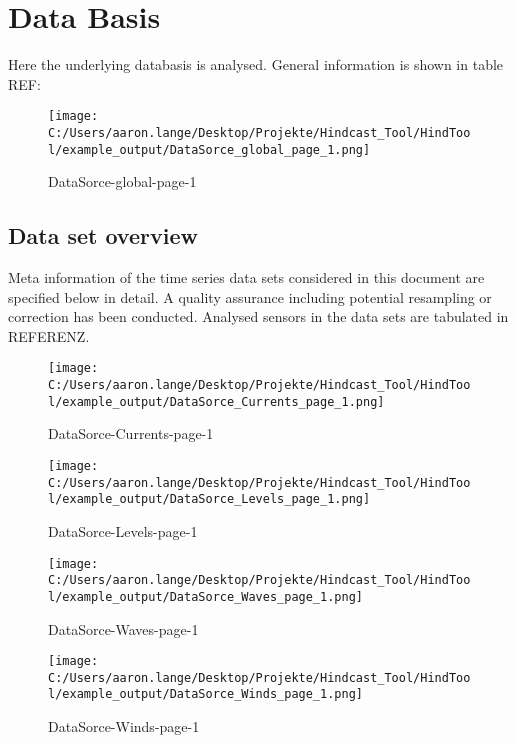 \section{Data Basis}
Here the underlying databasis is analysed. General information is shown in table REF:

\begin{figure}[H] 
 \centering 
 \texttt{[image: C:/Users/aaron.lange/Desktop/Projekte/Hindcast\_Tool/HindTool/example\_output/DataSorce\_global\_page\_1.png]} 
 \captionsetup{type=table} 
\caption{ DataSorce-global-page-1 } 
 \label{tab: DataSorce_global_page_1 } 
\end{figure}

\subsection{Data set overview}

Meta information of the time series data sets considered in this document are specified below in detail. A quality assurance including potential resampling or correction has been conducted. Analysed sensors in the data sets are tabulated in REFERENZ.

\begin{figure}[H] 
 \centering 
 \texttt{[image: C:/Users/aaron.lange/Desktop/Projekte/Hindcast\_Tool/HindTool/example\_output/DataSorce\_Currents\_page\_1.png]} 
 \captionsetup{type=table} 
\caption{ DataSorce-Currents-page-1 } 
 \label{tab: DataSorce_Currents_page_1 } 
\end{figure}
\begin{figure}[H] 
 \centering 
 \texttt{[image: C:/Users/aaron.lange/Desktop/Projekte/Hindcast\_Tool/HindTool/example\_output/DataSorce\_Levels\_page\_1.png]} 
 \captionsetup{type=table} 
\caption{ DataSorce-Levels-page-1 } 
 \label{tab: DataSorce_Levels_page_1 } 
\end{figure}
\begin{figure}[H] 
 \centering 
 \texttt{[image: C:/Users/aaron.lange/Desktop/Projekte/Hindcast\_Tool/HindTool/example\_output/DataSorce\_Waves\_page\_1.png]} 
 \captionsetup{type=table} 
\caption{ DataSorce-Waves-page-1 } 
 \label{tab: DataSorce_Waves_page_1 } 
\end{figure}
\begin{figure}[H] 
 \centering 
 \texttt{[image: C:/Users/aaron.lange/Desktop/Projekte/Hindcast\_Tool/HindTool/example\_output/DataSorce\_Winds\_page\_1.png]} 
 \captionsetup{type=table} 
\caption{ DataSorce-Winds-page-1 } 
 \label{tab: DataSorce_Winds_page_1 } 
\end{figure}


